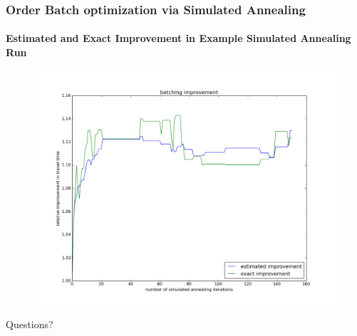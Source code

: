 \documentclass[english,a4,aspectratio=169]{beamer}
\begin{document}
\begin{frame}
 \frametitle{Order Batch optimization via Simulated Annealing}
 \framesubtitle{Estimated and Exact Improvement in Example Simulated Annealing Run}
 \begin{figure}
  \centering
  \includegraphics[height=.85\textheight]{../figures/sim_an_run.png}
 \end{figure}
\end{frame}

\begin{frame}
\begin{center}
 Questions?
\end{center}
\end{frame}
\end{document}
